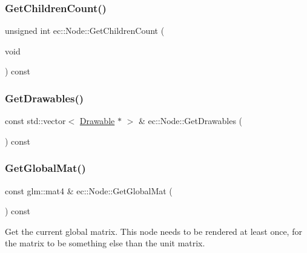 \mbox{\label{classec_1_1_node_afc08689badadadcbbca919858994d30b}} 
\subsubsection{\texorpdfstring{Get\+Children\+Count()}{GetChildrenCount()}}
{\footnotesize\ttfamily unsigned int ec\+::\+Node\+::\+Get\+Children\+Count (\begin{DoxyParamCaption}\item[{void}]{ }\end{DoxyParamCaption}) const}

\mbox{\label{classec_1_1_node_ab1cd50204e1b38c9c1b31e46d13ea915}} 
\subsubsection{\texorpdfstring{Get\+Drawables()}{GetDrawables()}}
{\footnotesize\ttfamily const std\+::vector$<$ \mbox{\hyperlink{classec_1_1_drawable}{Drawable}} $\ast$ $>$ \& ec\+::\+Node\+::\+Get\+Drawables (\begin{DoxyParamCaption}{ }\end{DoxyParamCaption}) const\hspace{0.3cm}{\ttfamily [virtual]}}

\mbox{\label{classec_1_1_node_aafbc9c31eb710b1ac22834792e039435}} 
\subsubsection{\texorpdfstring{Get\+Global\+Mat()}{GetGlobalMat()}}
{\footnotesize\ttfamily const glm\+::mat4 \& ec\+::\+Node\+::\+Get\+Global\+Mat (\begin{DoxyParamCaption}{ }\end{DoxyParamCaption}) const}

Get the current global matrix. This node needs to be rendered at least once, for the matrix to be something else than the unit matrix. \mbox{\label{classec_1_1_node_a88919835b03a7055f4c1c50c68b83fac}} 
